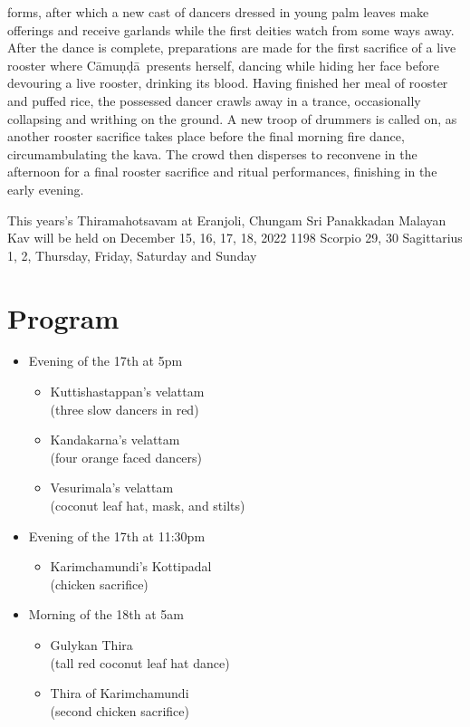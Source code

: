 \documentclass[a4paper, 11pt]{article} %
\newcommand{\camunda}[0]{C\={a}mu\d{n}\d{d}\={a}}
\begin{document}
forms, after which a new cast of dancers dressed in young palm leaves make offerings and receive garlands while the first deities watch from some ways away.
After the dance is complete, preparations are made for the first sacrifice of a live rooster where \camunda\ presents herself, dancing while hiding her face before devouring a live rooster, drinking its blood.
Having finished her meal of rooster and puffed rice, the possessed dancer crawls away in a trance, occasionally collapsing and writhing on the ground. 
A new troop of drummers is called on, as another rooster sacrifice takes place before the final morning fire dance, circumambulating the kava.
The crowd then disperses to reconvene in the afternoon for a final rooster sacrifice and ritual performances, finishing in the early evening.

This years's Thiramahotsavam at Eranjoli, Chungam Sri Panakkadan Malayan Kav will be held on December 15, 16, 17, 18, 2022 1198 Scorpio 29, 30 Sagittarius 1, 2, Thursday, Friday, Saturday and Sunday


\section{Program}%
  \label{sec:Program}
  
\begin{itemize}
  \item Evening of the 17th at 5pm
  \begin{itemize}
    \item Kuttishastappan's velattam\\
      (three slow dancers in red)
    \item Kandakarna's velattam\\
      (four orange faced dancers)
    \item Vesurimala's velattam\\
      (coconut leaf hat, mask, and stilts)
  \end{itemize}
  \item Evening of the 17th at 11:30pm
  \begin{itemize}
    \item Karimchamundi's Kottipadal\\
      (chicken sacrifice)
  \end{itemize}
  \item Morning of the 18th at 5am
  \begin{itemize}
    \item Gulykan Thira\\
      (tall red coconut leaf hat dance)
    \item Thira of Karimchamundi\\
      (second chicken sacrifice)
  \end{itemize}
\end{itemize}















\vfill

\end{document}
